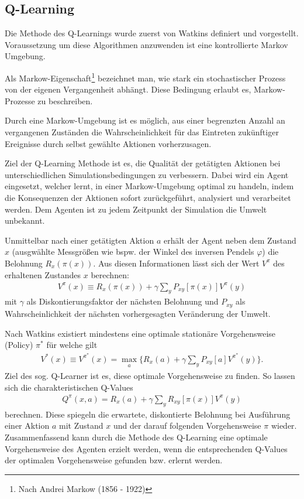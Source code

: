 	\subsection{Q-Learning}
	\label{subsec:rl_qlearning}
		Die Methode des Q-Learnings wurde zuerst von Watkins \cite{Watkins1992} definiert und vorgestellt. Voraussetzung um diese Algorithmen anzuwenden ist eine kontrollierte Markov Umgebung.
		\begin{remark}
			Als Markow-Eigenschaft\footnote{Nach Andrei Markow (1856 - 1922)} bezeichnet man, wie stark ein stochastischer Prozess von der eigenen Vergangenheit abhängt. Diese Bedingung erlaubt es, Markow-Prozesse zu beschreiben.
			
			Durch eine Markow-Umgebung ist es möglich, aus einer begrenzten Anzahl an vergangenen Zuständen die Wahrscheinlichkeit für das Eintreten zukünftiger Ereignisse durch selbst gewählte Aktionen vorherzusagen. \cite{SilverRL}
		\end{remark}
		Ziel der Q-Learning Methode ist es, die Qualität der getätigten Aktionen bei unterschiedlichen Simulationsbedingungen zu verbessern. Dabei wird ein Agent eingesetzt, welcher lernt, in einer Markow-Umgebung optimal zu handeln, indem die Konsequenzen der Aktionen sofort zurückgeführt, analysiert und verarbeitet werden. Dem Agenten ist zu jedem Zeitpunkt der Simulation die Umwelt unbekannt.
		
		Unmittelbar nach einer getätigten Aktion $a$ erhält der Agent neben dem Zustand $x$ (ausgwählte Messgrößen wie bspw. der Winkel des inversen Pendels $\varphi$) die Belohnung $R_x(\pi(x))$. Aus diesen Informationen lässt sich der Wert $V^\pi$ des erhaltenen Zustandes $x$ berechnen:
		\begin{align}
			V^\pi(x) \equiv R_x(\pi(x)) + \gamma \sum_{y}P_{xy}[\pi(x)]V^\pi(y)
		\end{align}
		mit $\gamma$ als Diskontierungsfaktor der nächsten Belohnung und $P_{xy}$ als Wahrscheinlichkeit der nächsten vorhergesagten Veränderung der Umwelt.
		
		Nach Watkins existiert mindestens eine optimale stationäre Vorgehensweise (\glqq Policy\grqq) $\pi^*$ für welche gilt
		\begin{align}
			V^*(x) \equiv V^{\pi^*}(x) = \max_{\substack{a}} \bigg\{R_x(a) + \gamma \sum_{y}P_{xy}[a]V^{\pi^*}(y)\bigg\}.
		\end{align}
		Ziel des sog. \glqq Q-Learner\grqq{} ist es, diese optimale Vorgehensweise zu finden. So lassen sich die charakteristischen Q-Values
		\begin{align}
			Q^\pi(x,a) = R_x(a) + \gamma \sum_{y}R_{xy}[\pi(x)]V^\pi(y)
		\end{align}
		berechnen. Diese spiegeln die erwartete, diskontierte Belohnung bei Ausführung einer Aktion $a$ mit Zustand $x$ und der darauf folgenden Vorgehensweise $\pi$ wieder. Zusammenfassend kann durch die Methode des Q-Learning eine optimale Vorgehensweise des Agenten erzielt werden, wenn die entsprechenden Q-Values der optimalen Vorgehensweise gefunden bzw. erlernt werden.
